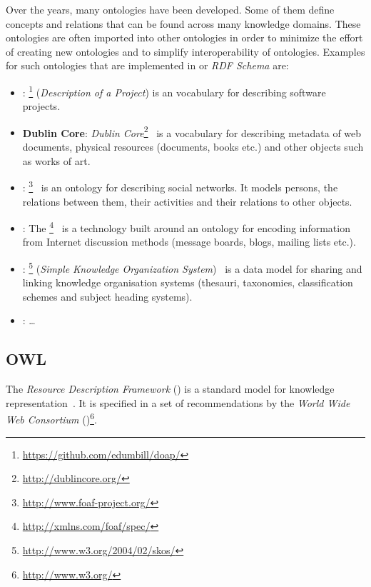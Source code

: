 Over the years, many ontologies have been developed. Some of them define concepts and relations that can be found across many knowledge domains. These ontologies are often imported into other ontologies in order to minimize the effort of creating new ontologies and to simplify interoperability of ontologies. Examples for such ontologies that are implemented in  or \emph{RDF Schema} are:
\begin{itemize} %
  \item \textbf{}: \footnote{\href{https://github.com/edumbill/doap/}{https://github.com/edumbill/doap/}} (\emph{Description of a Project}) is an vocabulary for describing software projects.
  \item \textbf{Dublin Core}: \emph{Dublin Core}\footnote{\href{http://dublincore.org/}{http://dublincore.org/}}~\cite{rfc5013} is a vocabulary for describing metadata of web documents, physical resources (documents, books etc.) and other objects such as works of art.
  \item \textbf{}: \footnote{\href{http://www.foaf-project.org/}{http://www.foaf-project.org/}}~\cite{FOAF} is an ontology for describing social networks. It models persons, the relations between them, their activities and their relations to other objects.
  \item \textbf{}: The  \footnote{\href{http://xmlns.com/foaf/spec/}{http://xmlns.com/foaf/spec/}}~\cite{SIOC} is a technology built around an ontology for encoding information from Internet discussion methods (message boards, blogs, mailing lists etc.).
  \item \textbf{}: \footnote{\href{http://www.w3.org/2004/02/skos/}{http://www.w3.org/2004/02/skos/}} (\emph{Simple Knowledge Organization System})~\cite{SKOS} is a data model for sharing and linking knowledge organisation systems (thesauri, taxonomies, classification schemes and subject heading systems).
  \item \textbf{}: … %
\end{itemize}

\subsection{OWL}
\label{subsec:owl}

The \emph{Resource Description Framework} () is a standard model for knowledge representation~\cite{RDF}. It is specified in a set of recommendations by the \emph{World Wide Web Consortium} ()\footnote{\href{http://www.w3.org/}{http://www.w3.org/}}.

